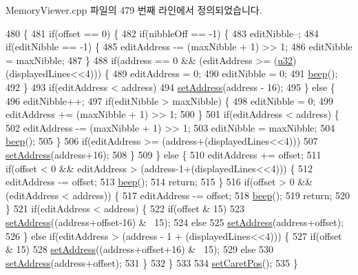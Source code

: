 Memory\+Viewer.\+cpp 파일의 479 번째 라인에서 정의되었습니다.


\begin{DoxyCode}
480 \{
481   \textcolor{keywordflow}{if}(offset == 0) \{
482     \textcolor{keywordflow}{if}(nibbleOff == -1) \{
483       editNibble--;
484       \textcolor{keywordflow}{if}(editNibble == -1) \{
485         editAddress -= (maxNibble + 1) >> 1;
486         editNibble = maxNibble;
487       \}
488       \textcolor{keywordflow}{if}(address == 0 && (editAddress >= (\mbox{\hyperlink{_system_8h_a10e94b422ef0c20dcdec20d31a1f5049}{u32}})(displayedLines<<4))) \{
489         editAddress = 0;
490         editNibble = 0;
491         \mbox{\hyperlink{class_memory_viewer_a32096a7542505dd4c2b94b9a1f715ae9}{beep}}();
492       \}
493       \textcolor{keywordflow}{if}(editAddress < address)
494         \mbox{\hyperlink{class_memory_viewer_abe391051455e116889da0613c19888a2}{setAddress}}(address - 16);
495     \} \textcolor{keywordflow}{else} \{
496       editNibble++;
497       \textcolor{keywordflow}{if}(editNibble > maxNibble) \{
498         editNibble = 0;
499         editAddress += (maxNibble + 1) >> 1;
500       \}
501       \textcolor{keywordflow}{if}(editAddress < address) \{
502         editAddress -= (maxNibble + 1) >> 1;
503         editNibble = maxNibble;
504         \mbox{\hyperlink{class_memory_viewer_a32096a7542505dd4c2b94b9a1f715ae9}{beep}}();
505       \}
506       \textcolor{keywordflow}{if}(editAddress >= (address+(displayedLines<<4)))
507         \mbox{\hyperlink{class_memory_viewer_abe391051455e116889da0613c19888a2}{setAddress}}(address+16);
508     \}
509   \} \textcolor{keywordflow}{else} \{
510     editAddress += offset;
511     \textcolor{keywordflow}{if}(offset < 0 && editAddress > (address-1+(displayedLines<<4))) \{
512       editAddress -= offset;
513       \mbox{\hyperlink{class_memory_viewer_a32096a7542505dd4c2b94b9a1f715ae9}{beep}}();
514       \textcolor{keywordflow}{return};
515     \}
516     \textcolor{keywordflow}{if}(offset > 0 && (editAddress < address)) \{
517       editAddress -= offset;
518       \mbox{\hyperlink{class_memory_viewer_a32096a7542505dd4c2b94b9a1f715ae9}{beep}}();
519       \textcolor{keywordflow}{return};
520     \}
521     \textcolor{keywordflow}{if}(editAddress < address) \{
522       \textcolor{keywordflow}{if}(offset & 15)
523         \mbox{\hyperlink{class_memory_viewer_abe391051455e116889da0613c19888a2}{setAddress}}((address+offset-16) & ~15);
524       \textcolor{keywordflow}{else}
525         \mbox{\hyperlink{class_memory_viewer_abe391051455e116889da0613c19888a2}{setAddress}}(address+offset);
526     \} \textcolor{keywordflow}{else} \textcolor{keywordflow}{if}(editAddress > (address - 1 + (displayedLines<<4))) \{
527       \textcolor{keywordflow}{if}(offset & 15)
528         \mbox{\hyperlink{class_memory_viewer_abe391051455e116889da0613c19888a2}{setAddress}}((address+offset+16) & ~15);
529       \textcolor{keywordflow}{else}
530         \mbox{\hyperlink{class_memory_viewer_abe391051455e116889da0613c19888a2}{setAddress}}(address+offset);
531     \}
532   \}
533 
534   \mbox{\hyperlink{class_memory_viewer_abfed49727a6de1b52e5495ed96816759}{setCaretPos}}();
535 \}
\end{DoxyCode}
